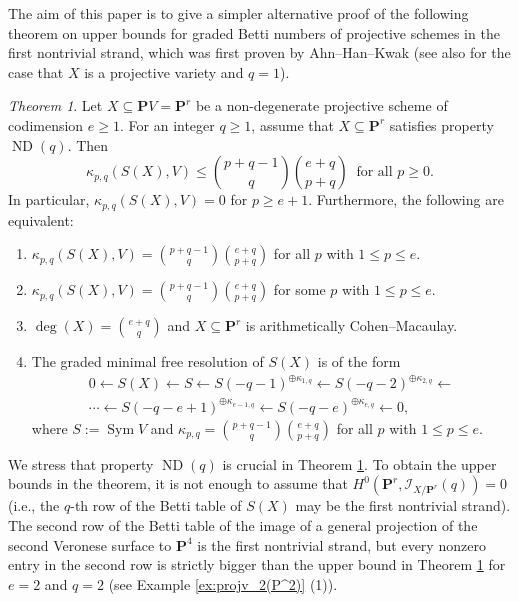 \documentclass[12pt]{amsart}
\theoremstyle{definition}
\theoremstyle{remark}
\theoremstyle{corollary}
\theoremstyle{theorem}
\theoremstyle{corollary}
\newtheorem{theorem}{Theorem}[section]
\theoremstyle{corollary}
\theoremstyle{definition}
\theoremstyle{remark}
\numberwithin{equation}{section}
\def\nP{\mathbf{P}}
\def\Sym{\operatorname{Sym}}
\DeclareMathOperator{\ND}{ND}
\begin{document}
\medskip

The aim of this paper is to give a simpler alternative proof of the following theorem on upper bounds for graded Betti numbers of projective schemes in the first nontrivial strand, which was first proven by Ahn--Han--Kwak \cite[Theorem 1.1]{AHK} (see also \cite[Theorems 1.2 and 1.3]{HK} for the case that $X$ is a projective variety and $q=1$).

\begin{theorem}\label{thm:main}
Let $X \subseteq \nP V = \nP^r$ be a non-degenerate projective scheme of codimension $e \geq 1$. For an integer $q \geq 1$, assume that $X \subseteq \nP^r$ satisfies property $\ND(q)$. Then
$$
\kappa_{p,q}(S(X), V) \leq {p+q-1 \choose q} {e+q \choose p+q}~\text{ for all $p \geq 0$}.
$$
In particular, $\kappa_{p,q}(S(X), V)=0$ for $p \geq e+1$.
Furthermore, the following are equivalent:
\begin{enumerate}
 \item $\kappa_{p,q}(S(X), V) = {p+q-1 \choose q} {e+q \choose p+q}$ for all $p$ with $1 \leq p \leq e$.
 \item $\kappa_{p,q}(S(X), V) = {p+q-1 \choose q} {e+q \choose p+q}$ for some $p$ with $1 \leq p \leq e$.
 \item $\deg (X) = {e+q \choose q}$ and $X \subseteq \nP^r$ is arithmetically Cohen--Macaulay.
 \item The graded minimal free resolution of $S(X)$ is of the form
 \begin{align*}
 0 \longleftarrow S(X) \longleftarrow S \longleftarrow S(-q-1)^{\oplus \kappa_{1,q}} \longleftarrow S(-q-2)^{\oplus  \kappa_{2,q}}  \longleftarrow  \\
\cdots \longleftarrow S(-q-e+1)^{\oplus  \kappa_{e-1, q}}\longleftarrow S(-q-e)^{\oplus  \kappa_{e,q}} \longleftarrow 0,
 \end{align*}
 where $S:=\Sym V$ and $\kappa_{p,q}={p+q-1 \choose q} {e+q \choose p+q}$ for all $p$ with $1 \leq p \leq e$.
\end{enumerate}
\end{theorem}

We stress that property $\ND(q)$ is crucial in Theorem \ref{thm:main}. To obtain the upper bounds in the theorem, it is not enough to assume that $H^0(\nP^r, \mathscr{I}_{X/\nP^r}(q))=0$ (i.e., the $q$-th row of the Betti table of $S(X)$ may be the first nontrivial strand). The second row of the Betti table of the image of a general projection of the second Veronese surface to $\nP^4$ is the first nontrivial strand, but every nonzero entry in the second row is strictly bigger than the upper bound in Theorem \ref{thm:main} for $e=2$ and $q=2$ (see Example \ref{ex:projv_2(P^2)} (1)).
\end{document}

